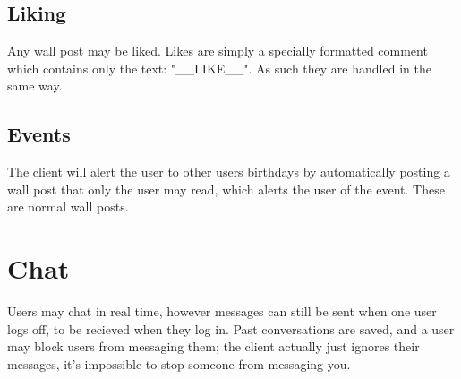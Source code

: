 \subsection{Liking}
Any wall post may be liked. Likes are simply a specially formatted comment
which contains only the text: "\_\_LIKE\_\_". As such they are handled in the same
way.
    
\subsection{Events}
The client will alert the user to other users birthdays by automatically posting
a wall post that only the user may read, which alerts the user of the event.
These are normal wall posts.

\section{Chat}
Users may chat in real time, however messages can still be sent when one user
logs off, to be recieved when they log in. Past conversations are saved, and a
user may block users from messaging them; the client actually just ignores their
messages, it's impossible to stop someone from messaging you.
